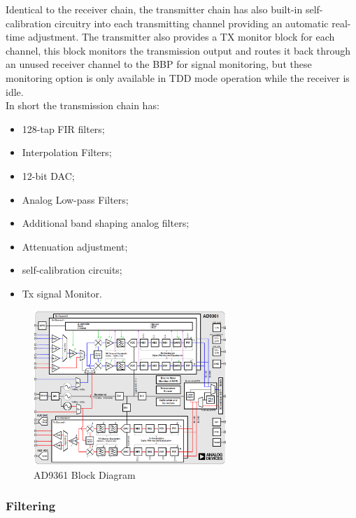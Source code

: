 Identical to the receiver chain, the transmitter chain has also built-in
self-calibration circuitry into each transmitting channel providing an automatic
real-time adjustment. The transmitter also provides a TX monitor block for each
channel, this block monitors the transmission output and routes it back through
an unused receiver channel to the BBP for signal monitoring, but these
monitoring option is only available in TDD mode operation while the receiver is
idle.\\

In short the transmission chain has:

\begin{itemize}
	\item 128-tap FIR filters;
	\item Interpolation Filters;
	\item 12-bit DAC;
	\item Analog Low-pass Filters;
	\item Additional band shaping analog filters;
	\item Attenuation adjustment;
	\item self-calibration circuits;
	\item Tx signal Monitor.
\end{itemize}

\begin{figure}[htbp]
    \centering
    \includegraphics[width=0.65\textwidth]{./figures/ad9361_block_diagram}
    \caption{ AD9361 Block Diagram
    \label{fig:ad9361blk}}
\end{figure}

\subsubsection{Filtering}

